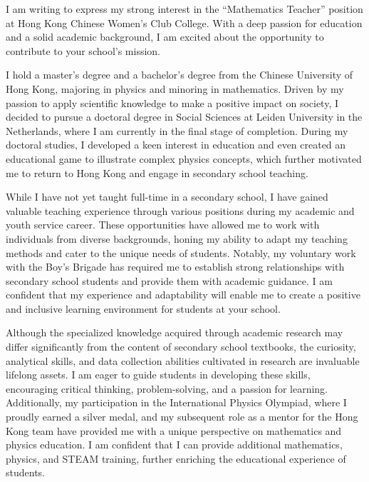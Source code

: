 \documentclass[11pt, a4paper]{awesome-cv}
\begin{document}
\makecvheader[R]

\makecvfooter
  {}%
  {}%
  {}

\makelettertitle

\begin{cvletter}

I am writing to express my strong interest in the ``Mathematics Teacher'' position at Hong Kong Chinese Women's Club College. With a deep passion for education and a solid academic background, I am excited about the opportunity to contribute to your school's mission.

I hold a master's degree and a bachelor's degree from the Chinese University of Hong Kong, majoring in physics and minoring in mathematics. Driven by my passion to apply scientific knowledge to make a positive impact on society, I decided to pursue a doctoral degree in Social Sciences at Leiden University in the Netherlands, where I am currently in the final stage of completion. During my doctoral studies, I developed a keen interest in education and even created an educational game to illustrate complex physics concepts, which further motivated me to return to Hong Kong and engage in secondary school teaching.

While I have not yet taught full-time in a secondary school, I have gained valuable teaching experience through various positions during my academic and youth service career. These opportunities have allowed me to work with individuals from diverse backgrounds, honing my ability to adapt my teaching methods and cater to the unique needs of students. Notably, my voluntary work with the Boy's Brigade has required me to establish strong relationships with secondary school students and provide them with academic guidance. I am confident that my experience and adaptability will enable me to create a positive and inclusive learning environment for students at your school.

Although the specialized knowledge acquired through academic research may differ significantly from the content of secondary school textbooks, the curiosity, analytical skills, and data collection abilities cultivated in research are invaluable lifelong assets. I am eager to guide students in developing these skills, encouraging critical thinking, problem-solving, and a passion for learning. Additionally, my participation in the International Physics Olympiad, where I proudly earned a silver medal, and my subsequent role as a mentor for the Hong Kong team have provided me with a unique perspective on mathematics and physics education. I am confident that I can provide additional mathematics, physics, and STEAM training, further enriching the educational experience of students.


\end{cvletter}
\end{document}
